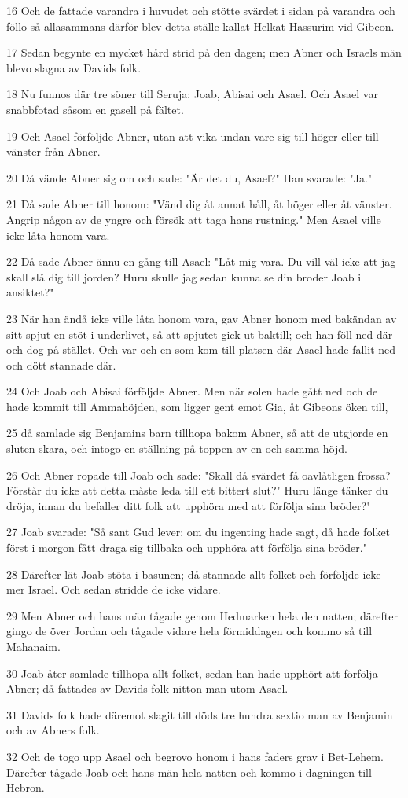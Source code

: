 \par 16 Och de fattade varandra i huvudet och stötte svärdet i sidan på varandra och föllo så allasammans därför blev detta ställe kallat Helkat-Hassurim vid Gibeon.
\par 17 Sedan begynte en mycket hård strid på den dagen; men Abner och Israels män blevo slagna av Davids folk.
\par 18 Nu funnos där tre söner till Seruja: Joab, Abisai och Asael. Och Asael var snabbfotad såsom en gasell på fältet.
\par 19 Och Asael förföljde Abner, utan att vika undan vare sig till höger eller till vänster från Abner.
\par 20 Då vände Abner sig om och sade: "Är det du, Asael?" Han svarade: "Ja."
\par 21 Då sade Abner till honom: "Vänd dig åt annat håll, åt höger eller åt vänster. Angrip någon av de yngre och försök att taga hans rustning." Men Asael ville icke låta honom vara.
\par 22 Då sade Abner ännu en gång till Asael: "Låt mig vara. Du vill väl icke att jag skall slå dig till jorden? Huru skulle jag sedan kunna se din broder Joab i ansiktet?"
\par 23 När han ändå icke ville låta honom vara, gav Abner honom med bakändan av sitt spjut en stöt i underlivet, så att spjutet gick ut baktill; och han föll ned där och dog på stället. Och var och en som kom till platsen där Asael hade fallit ned och dött stannade där.
\par 24 Och Joab och Abisai förföljde Abner. Men när solen hade gått ned och de hade kommit till Ammahöjden, som ligger gent emot Gia, åt Gibeons öken till,
\par 25 då samlade sig Benjamins barn tillhopa bakom Abner, så att de utgjorde en sluten skara, och intogo en ställning på toppen av en och samma höjd.
\par 26 Och Abner ropade till Joab och sade: "Skall då svärdet få oavlåtligen frossa? Förstår du icke att detta måste leda till ett bittert slut?" Huru länge tänker du dröja, innan du befaller ditt folk att upphöra med att förfölja sina bröder?"
\par 27 Joab svarade: "Så sant Gud lever: om du ingenting hade sagt, då hade folket först i morgon fått draga sig tillbaka och upphöra att förfölja sina bröder."
\par 28 Därefter lät Joab stöta i basunen; då stannade allt folket och förföljde icke mer Israel. Och sedan stridde de icke vidare.
\par 29 Men Abner och hans män tågade genom Hedmarken hela den natten; därefter gingo de över Jordan och tågade vidare hela förmiddagen och kommo så till Mahanaim.
\par 30 Joab åter samlade tillhopa allt folket, sedan han hade upphört att förfölja Abner; då fattades av Davids folk nitton man utom Asael.
\par 31 Davids folk hade däremot slagit till döds tre hundra sextio man av Benjamin och av Abners folk.
\par 32 Och de togo upp Asael och begrovo honom i hans faders grav i Bet-Lehem. Därefter tågade Joab och hans män hela natten och kommo i dagningen till Hebron.


